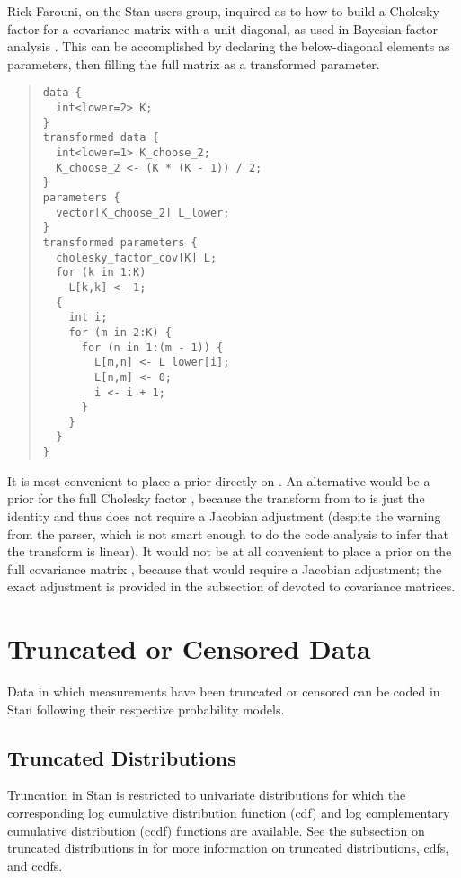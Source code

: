 Rick Farouni, on the Stan users group, inquired as to how to build
a Cholesky factor for a covariance matrix with a unit diagonal, as
used in Bayesian factor analysis \cite{aguilar-west:2000}.  This
can be accomplished by declaring the below-diagonal elements as
parameters, then filling the full matrix as a transformed parameter.
%
\begin{quote}
\begin{Verbatim}
data {
  int<lower=2> K;
}
transformed data {
  int<lower=1> K_choose_2;
  K_choose_2 <- (K * (K - 1)) / 2;
}
parameters {
  vector[K_choose_2] L_lower;  
}
transformed parameters {
  cholesky_factor_cov[K] L;
  for (k in 1:K)
    L[k,k] <- 1;
  { 
    int i;
    for (m in 2:K) {
      for (n in 1:(m - 1)) {
        L[m,n] <- L_lower[i];
        L[n,m] <- 0;
        i <- i + 1;
      }
    }
  }
}
\end{Verbatim}
\end{quote}
%
It is most convenient to place a prior directly on .
An alternative would be a prior for the full Cholesky factor ,
because the transform from  to  is just the
identity and thus does not require a Jacobian adjustment (despite the
warning from the parser, which is not smart enough to do the code
analysis to infer that the transform is linear).  It would not be at
all convenient to place a prior on the full covariance matrix , because that would require a Jacobian adjustment; the exact
adjustment is provided in the subsection of
 devoted to covariance matrices.

\chapter{Truncated or Censored Data}

\noindent
Data in which measurements have been truncated or censored can be
coded in Stan following their respective probability models.

\section{Truncated Distributions}

Truncation in Stan is restricted to univariate distributions for which
the corresponding log cumulative distribution function (cdf) and log
complementary cumulative distribution (ccdf) functions are available.
See the subsection on truncated distributions in
 for more information on truncated
distributions, cdfs, and ccdfs.

